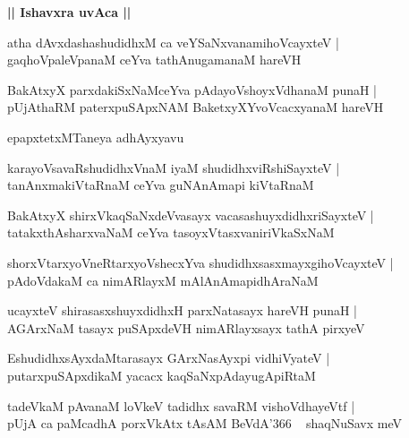 \documentclass[twoside,12pt,openright]{book}
\newcounter{shloka}[chapter]
\def\uvaca#1{\centerline{{\large\textbf{#1}}}}
\begin{document}
\uvaca{|| Ishavxra uvAca ||}

\begin{shloka}%
atha dAvxdashashudidhxM ca veYSaNxvanamihoVcayxteV |\\
gaqhoVpaleVpanaM ceYva tathAnugamanaM hareVH
\end{shloka}

\begin{shloka}%
BakAtxyX parxdakiSxNaMceYva pAdayoVshoyxVdhanaM punaH |\\
pUjAthaRM paterxpuSApxNAM BaketxyXYvoVcacxyanaM hareVH
\end{shloka}

\begin{center}
epapxtetxMTaneya adhAyxyavu
\end{center}

\begin{shloka}%
karayoVsavaRshudidhxVnaM iyaM shudidhxviRshiSayxteV |\\
tanAnxmakiVtaRnaM ceYva guNAnAmapi kiVtaRnaM
\end{shloka}

\begin{shloka}%
BakAtxyX shirxVkaqSaNxdeVvasayx vacasashuyxdidhxriSayxteV |\\
tatakxthAsharxvaNaM ceYva tasoyxVtasxvaniriVkaSxNaM
\end{shloka}

\begin{shloka}%
shorxVtarxyoVneRtarxyoVshecxYva shudidhxsasxmayxgihoVcayxteV |\\
pAdoVdakaM ca nimARlayxM mAlAnAmapidhAraNaM
\end{shloka}

\begin{shloka}%
ucayxteV shirasasxshuyxdidhxH parxNatasayx hareVH punaH |\\
AGArxNaM tasayx puSApxdeVH nimARlayxsayx tathA pirxyeV
\end{shloka}

\begin{shloka}%
EshudidhxsAyxdaMtarasayx GArxNasAyxpi vidhiVyateV |\\
putarxpuSApxdikaM yacacx kaqSaNxpAdayugApiRtaM 
\end{shloka}

\begin{shloka}%
tadeVkaM pAvanaM loVkeV tadidhx savaRM vishoVdhayeVtf |\\
pUjA ca paMcadhA porxVkAtx tAsAM BeVdA\char'366 ~ shaqNuSavx meV 
\end{shloka}
\end{document}
